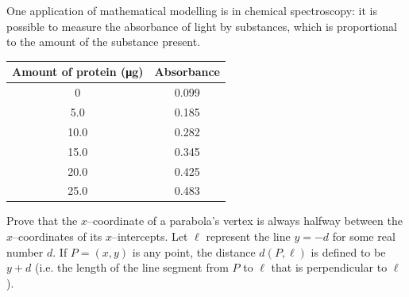 \begin{questions}
  \question One application of mathematical modelling is in chemical spectroscopy: it is possible to measure the absorbance
            of light by substances, which is proportional to the amount of the substance present.
            \begin{center}
              \begin{tabular}{|c|c|}\hline
                \textbf{Amount of protein} (\si{\micro\gram}) & \textbf{Absorbance}\\\hline
                0 & 0.099\\\hline
                5.0 & 0.185\\\hline
                10.0 & 0.282\\\hline
                15.0 & 0.345\\\hline
                20.0 & 0.425\\\hline
                25.0 & 0.483\\\hline
              \end{tabular}
            \end{center}
  \question Prove that the $ x$--coordinate of a parabola's vertex is always halfway between the $ x$--coordinates of its $ x$--intercepts.
  \question Let $ \ell $ represent the line $ y = -d $ for some real number $ d $. If $ P = (x,y) $ is any point, the distance $ d(P,\ell) $
            is defined to be $ y + d $ (i.e. the length of the line segment from $ P $ to $ \ell $ that is perpendicular to $ \ell $).
    \begin{parts}

\end{parts}
\end{questions}
